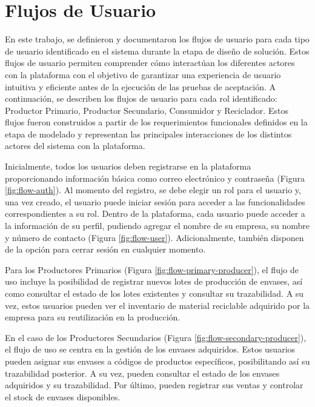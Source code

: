 \chapter{Flujos de Usuario}
\label{cp:user-flows}

\parindent0pt

En este trabajo, se definieron y documentaron los flujos de usuario para cada tipo de usuario identificado en el sistema durante la etapa de diseño de solución. Estos flujos de usuario permiten comprender cómo interactúan los diferentes actores con la plataforma con el objetivo de garantizar una experiencia de usuario intuitiva y eficiente antes de la ejecución de las pruebas de aceptación. A continuación, se describen los flujos de usuario para cada rol identificado: Productor Primario, Productor Secundario, Consumidor y Reciclador. Estos flujos fueron construidos a partir de los requerimientos funcionales definidos en la etapa de modelado y representan las principales interacciones de los distintos actores del sistema con la plataforma.

Inicialmente, todos los usuarios deben registrarse en la plataforma proporcionando información básica como correo electrónico y contraseña (Figura \ref{fig:flow-auth}). Al momento del registro, se debe elegir un rol para el usuario y, una vez creado, el usuario puede iniciar sesión para acceder a las funcionalidades correspondientes a su rol. Dentro de la plataforma, cada usuario puede acceder a la información de su perfil, pudiendo agregar el nombre de su empresa, su nombre y número de contacto (Figura \ref{fig:flow-user}). Adicionalmente, también disponen de la opción para cerrar sesión en cualquier momento.

Para los Productores Primarios (Figura \ref{fig:flow-primary-producer}), el flujo de uso incluye la posibilidad de registrar nuevos lotes de producción de envases, así como consultar el estado de los lotes existentes y consultar su \gls{trazabilidad}. A su vez, estos usuarios pueden ver el inventario de material reciclable adquirido por la empresa para su reutilización en la producción.

En el caso de los Productores Secundarios (Figura \ref{fig:flow-secondary-producer}), el flujo de uso se centra en la gestión de los envases adquiridos. Estos usuarios pueden asignar sus envases a códigos de productos específicos, posibilitando así su trazabilidad posterior. A su vez, pueden consultar el estado de los envases adquiridos y su trazabilidad. Por último, pueden registrar sus ventas y controlar el stock de envases disponibles.

